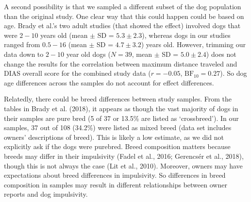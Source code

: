 \documentclass[
  pub,floatsintext]{apa6}
\begin{document}
A second possibility is that we sampled a different subset of the dog population than the original study. One clear way that this could happen could be based on age. Brady et al.'s two adult studies (that showed the effect) involved dogs that were \(2-10\) years old (mean \(\pm\) SD = \(5.3 \pm 2.3\)), whereas dogs in our studies ranged from \(0.5-16\) (mean \(\pm\) SD = \(4.7 \pm 3.2\)) years old. However, trimming our data down to \(2-10\) year old dogs (\(N = 39\), mean \(\pm\) SD = \(5.0 \pm 2.4\)) does not change the results for the correlation between maximum distance traveled and DIAS overall score for the combined study data (\(r = -0.05\), \(\mathrm{BF}_{\textrm{10}} = 0.27\)). So dog age differences across the samples do not account for effect differences.

Relatedly, there could be breed differences between study samples. From the tables in Brady et al. (2018), it appears as though the vast majority of dogs in their samples are pure bred (5 of 37 or 13.5\% are listed as `crossbreed'). In our samples, 37 out of 108 (34.2\%) were listed as mixed breed (data set includes owners' descriptions of breed). This is likely a low estimate, as we did not explicitly ask if the dogs were purebred. Breed composition matters because breeds may differ in their impulsivity (Fadel et al., 2016; Gerencsér et al., 2018), though this is not always the case (Lit et al., 2010). Moreover, owners may have expectations about breed differences in impulsivity. So differences in breed composition in samples may result in different relationships between owner reports and dog impulsivity.
\end{document}
